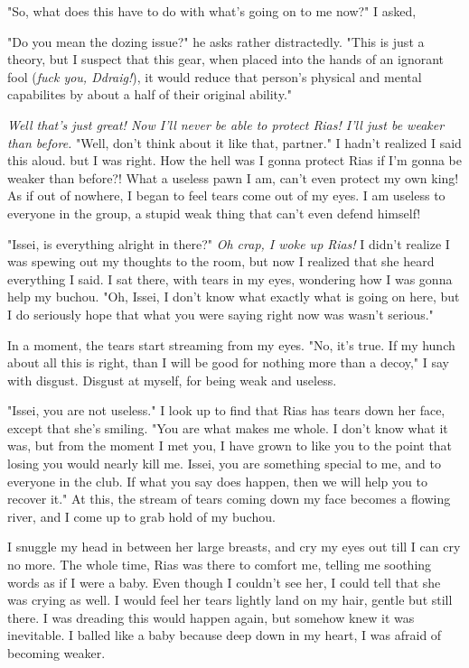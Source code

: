 \documentclass{article}
\begin{document}
"So, what does this have to do with what's going on to me now?" I asked,

"Do you mean the dozing issue?" he asks rather distractedly. "This is just a theory, but I suspect that this gear, when placed into the hands of an ignorant fool (\emph{fuck you, Ddraig!}), it would reduce that person's physical and mental capabilites by about a half of their original ability."

\emph{Well that's just great! Now I'll never be able to protect Rias! I'll just be weaker than before.} "Well, don't think about it like that, partner." I hadn't realized I said this aloud. but I was right. How the hell was I gonna protect Rias if I'm gonna be weaker than before?! What a useless pawn I am, can't even protect my own king! As if out of nowhere, I began to feel tears come out of my eyes. I am useless to everyone in the group, a stupid weak thing that can't even defend himself!

"Issei, is everything alright in there?" \emph{Oh crap, I woke up Rias!} I didn't realize I was spewing out my thoughts to the room, but now I realized that she heard everything I said. I sat there, with tears in my eyes, wondering how I was gonna help my buchou. "Oh, Issei, I don't know what exactly what is going on here, but I do seriously hope that what you were saying right now was wasn't serious."

In a moment, the tears start streaming from my eyes. "No, it's true. If my hunch about all this is right, than I will be good for nothing more than a decoy," I say with disgust. Disgust at myself, for being weak and useless.

"Issei, you are not useless." I look up to find that Rias has tears down her face, except that she's smiling. "You are what makes me whole. I don't know what it was, but from the moment I met you, I have grown to like you to the point that losing you would nearly kill me. Issei, you are something special to me, and to everyone in the club. If what you say does happen, then we will help you to recover it." At this, the stream of tears coming down my face becomes a flowing river, and I come up to grab hold of my buchou.

I snuggle my head in between her large breasts, and cry my eyes out till I can cry no more. The whole time, Rias was there to comfort me, telling me soothing words as if I were a baby. Even though I couldn't see her, I could tell that she was crying as well. I would feel her tears lightly land on my hair, gentle but still there. I was dreading this would happen again, but somehow knew it was inevitable. I balled like a baby because deep down in my heart, I was afraid of becoming weaker.
\end{document}
